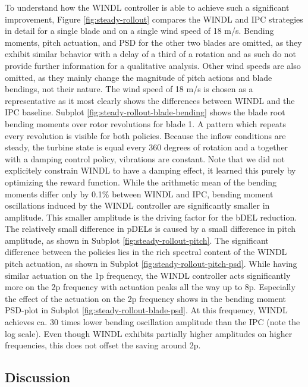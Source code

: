 To understand how the WINDL controller is able to achieve such a significant improvement, Figure \ref{fig:steady-rollout} compares the WINDL and IPC strategies in detail for a single blade and on a single wind speed of 18 m/s. Bending moments, pitch actuation, and \ac{PSD} for the other two blades are omitted, as they exhibit similar behavior with a delay of a third of a rotation and as such do not provide further information for a qualitative analysis. Other wind speeds are also omitted, as they mainly change the magnitude of pitch actions and blade bendings, not their nature. The wind speed of 18 m/s is chosen as a representative as it most clearly shows the differences between \ac{WINDL} and the IPC baseline. Subplot \ref{fig:steady-rollout-blade-bending} shows the blade root bending moments over rotor revolutions for blade 1. A pattern which repeats every revolution is visible for both policies. Because the inflow conditions are steady, the turbine state is equal every 360 degrees of rotation and a together with a damping control policy, vibrations are constant. Note that we did not explicitely constrain WINDL to have a damping effect, it learned this purely by optimizing the reward function. While the arithmetic mean of the bending moments differ only by 0.1\% between WINDL and IPC, bending moment oscillations induced by the WINDL controller are significantly smaller in amplitude. This smaller amplitude is the driving factor for the bDEL reduction. The relatively small difference in pDELs is caused by a small difference in pitch amplitude, as shown in Subplot \ref{fig:steady-rollout-pitch}. The significant difference between the policies lies in the rich spectral content of the WINDL pitch actuation, as shown in Subplot \ref{fig:steady-rollout-pitch-psd}. While having similar actuation on the 1p frequency, the WINDL controller acts significantly more on the 2p frequency with actuation peaks all the way up to 8p. Especially the effect of the actuation on the 2p frequency shows in the bending moment \ac{PSD}-plot in Subplot \ref{fig:steady-rollout-blade-psd}. At this frequency, WINDL achieves ca. 30 times lower bending oscillation amplitude than the IPC (note the log scale). Even though WINDL exhibits partially higher amplitudes on higher frequencies, this does not offset the saving around 2p.

\subsection{Discussion}

